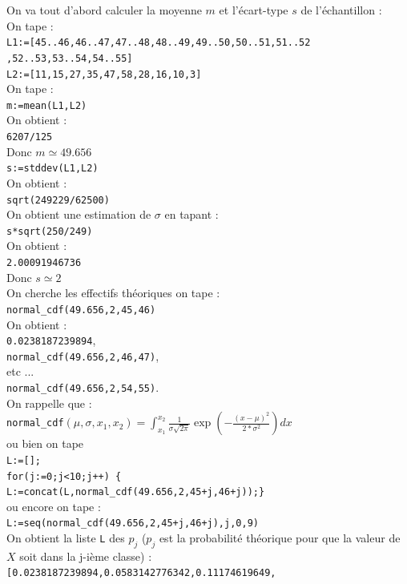 \documentclass[a4paper,11pt]{book}
\begin{document}
On va tout d'abord calculer la moyenne $m$ et l'\'ecart-type $s$ de 
l'\'echantillon :\\ 
On tape :\\
{\tt L1:=[45..46,46..47,47..48,48..49,49..50,50..51,51..52}\\
{\tt ,52..53,53..54,54..55]}\\
{\tt L2:=[11,15,27,35,47,58,28,16,10,3]}\\
On tape :\\
{\tt m:=mean(L1,L2)}\\
On obtient :\\
{\tt 6207/125}\\
Donc $m\simeq 49.656$\\
{\tt s:=stddev(L1,L2)}\\
On obtient :\\
{\tt sqrt(249229/62500)}\\
On obtient une estimation de $\sigma$ en tapant :\\
{\tt s*sqrt(250/249)}\\
On obtient :\\
{\tt 2.00091946736}\\
Donc $s \simeq 2$\\
On cherche les effectifs th\'eoriques on tape :\\
{\tt normal\_cdf(49.656,2,45,46)}\\
On obtient :\\
{\tt 0.0238187239894},\\
{\tt normal\_cdf(49.656,2,46,47)}, \\
etc ...\\
{\tt normal\_cdf(49.656,2,54,55)}.\\
On rappelle que : \\
{\tt normal\_cdf}$\displaystyle(\mu,\sigma,x_1,x_2)=\int_{x_1}^{x_2}
\frac{1}{\sigma\sqrt{2\pi}}\exp(-\frac{(x-\mu)^2}{2*\sigma^2})dx$\\
ou bien on tape \\
{\tt L:=[];}\\
{\tt for(j:=0;j<10;j++) \{}\\
{\tt L:=concat(L,normal\_cdf(49.656,2,45+j,46+j));\}}\\
ou encore on tape :\\
{\tt L:=seq(normal\_cdf(49.656,2,45+j,46+j),j,0,9)}\\
On obtient la liste {\tt L} des $p_j$  ($p_j$ est la probabilit\'e th\'eorique
pour que la valeur de $X$ soit dans la j-i\`eme classe) :\\
{\tt [0.0238187239894,0.0583142776342,0.11174619649,}\\
\end{document}
